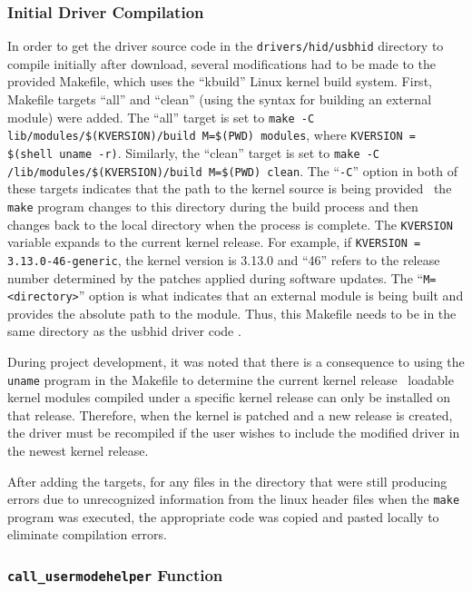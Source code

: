 \documentclass[pagenumbers]{ieee}
\begin{document}
\subsubsection{Initial Driver Compilation}

In order to get the driver source code in the \texttt{drivers/hid/usbhid} directory to compile initially after download, several modifications had to be made to the provided Makefile, which uses the ``kbuild'' Linux kernel build system. First, Makefile targets ``all'' and ``clean'' (using the syntax for building an external module) were added. The ``all'' target is set to \texttt{make -C lib/modules/\$(KVERSION)/build M=\$(PWD) modules}, where \texttt{KVERSION = \$(shell uname -r)}. Similarly, the ``clean'' target is set to \texttt{make -C /lib/modules/\$(KVERSION)/build M=\$(PWD) clean}. The ``\texttt{-C}'' option in both of these targets indicates that the path to the kernel source is being provided \textemdash \ the \texttt{make} program changes to this directory during the build process and then changes back to the local directory when the process is complete. The \texttt{KVERSION} variable expands to the current kernel release. For example, if \texttt{KVERSION = 3.13.0-46-generic}, the kernel version is 3.13.0 and ``46'' refers to the release number determined by the patches applied during software updates. The ``\texttt{M=<directory>}'' option is what indicates that an external module is being built and provides the absolute path to the module. Thus, this Makefile needs to be in the same directory as the usbhid driver code \cite{kbuild}.

During project development, it was noted that there is a consequence to using the \texttt{uname} program in the Makefile to determine the current kernel release \textemdash \ loadable kernel modules compiled under a specific kernel release can only be installed on that release. Therefore, when the kernel is patched and a new release is created, the driver must be recompiled if the user wishes to include the modified driver in the newest kernel release.

After adding the targets, for any files in the directory that were still producing errors due to unrecognized information from the linux header files when the \texttt{make} program was executed, the appropriate code was copied and pasted locally to eliminate compilation errors.

\subsubsection{\texttt{call\_usermodehelper} Function}
\end{document}
